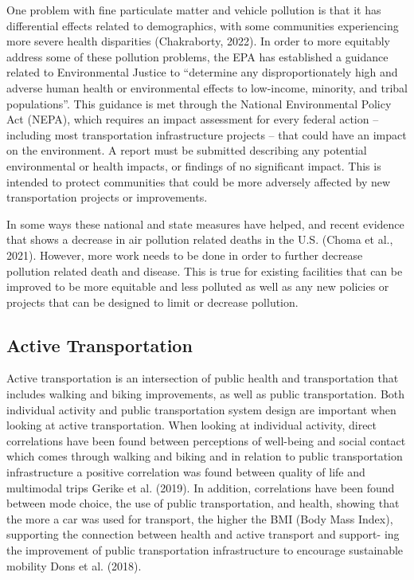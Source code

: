 \documentclass[
  letterpaper,
  DIV=11,
  numbers=noendperiod]{scrreport}
\begin{document}
One problem with fine particulate matter and vehicle pollution is that
it has differential effects related to demographics, with some
communities experiencing more severe health disparities (Chakraborty,
2022). In order to more equitably address some of these pollution
problems, the EPA has established a guidance related to Environmental
Justice to ``determine any disproportionately high and adverse human
health or environmental effects to low-income, minority, and tribal
populations''. This guidance is met through the National Environmental
Policy Act (NEPA), which requires an impact assessment for every federal
action -- including most transportation infrastructure projects -- that
could have an impact on the environment. A report must be submitted
describing any potential environmental or health impacts, or findings of
no significant impact. This is intended to protect communities that
could be more adversely affected by new transportation projects or
improvements.

In some ways these national and state measures have helped, and recent
evidence that shows a decrease in air pollution related deaths in the
U.S. (Choma et al., 2021). However, more work needs to be done in order
to further decrease pollution related death and disease. This is true
for existing facilities that can be improved to be more equitable and
less polluted as well as any new policies or projects that can be
designed to limit or decrease pollution.

\hypertarget{active-transportation}{%
\subsection{Active Transportation}\label{active-transportation}}

Active transportation is an intersection of public health and
transportation that includes walking and biking improvements, as well as
public transportation. Both individual activity and public
transportation system design are important when looking at active
transportation. When looking at individual activity, direct correlations
have been found between perceptions of well-being and social contact
which comes through walking and biking and in relation to public
transportation infrastructure a positive correlation was found between
quality of life and multimodal trips Gerike et al. (2019). In addition,
correlations have been found between mode choice, the use of public
transportation, and health, showing that the more a car was used for
transport, the higher the BMI (Body Mass Index), supporting the
connection between health and active transport and support- ing the
improvement of public transportation infrastructure to encourage
sustainable mobility Dons et al. (2018).
\end{document}
